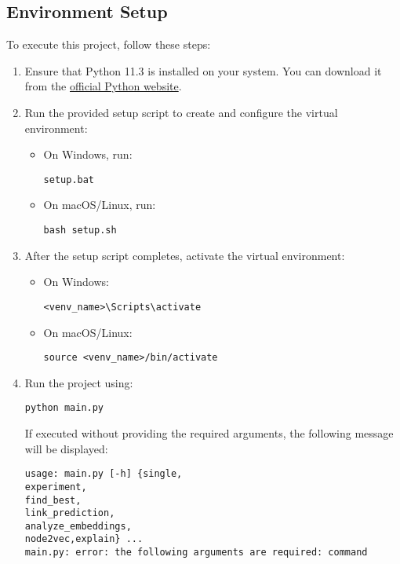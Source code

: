 	\subsection{Environment Setup}\label{sec:env-setup}
	
	To execute this project, follow these steps:
	
	\begin{enumerate}
		\item Ensure that Python 11.3 is installed on your system. You can download it from the \href{https://www.python.org/downloads/}{official Python website}.
		
		\item Run the provided setup script to create and configure the virtual environment:
		\begin{itemize}
			\item On Windows, run:
			\begin{tcolorbox}
				\texttt{setup.bat}
			\end{tcolorbox}
			\item On macOS/Linux, run:
			\begin{tcolorbox}
				\texttt{bash setup.sh}
			\end{tcolorbox}
		\end{itemize}
		
		\item After the setup script completes, activate the virtual environment:
		\begin{itemize}
			\item On Windows:
			\begin{tcolorbox}
				\texttt{<venv\_name>\textbackslash Scripts\textbackslash activate}
			\end{tcolorbox}
			\item On macOS/Linux:
			\begin{tcolorbox}
				\texttt{source <venv\_name>/bin/activate}
			\end{tcolorbox}
		\end{itemize}
		
		\item Run the project using:
		\begin{tcolorbox}
			\texttt{python main.py}
		\end{tcolorbox}
		If executed without providing the required arguments, the following message will be displayed:
		\begin{tcolorbox}[colback=gray!10, colframe=gray!50, sharp corners, boxrule=0.5mm]
			\texttt{usage: main.py [-h] \{single, \\
				experiment, \\
				find\_best, \\
				link\_prediction, \\
				analyze\_embeddings, \\
				node2vec,explain\} ...\\
				main.py: error: the following arguments are required: command}
		\end{tcolorbox}
		
	\end{enumerate}
	
